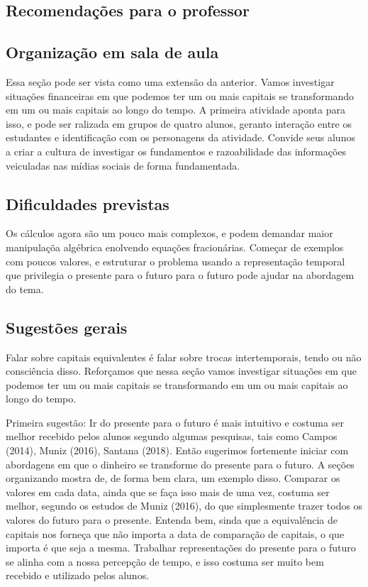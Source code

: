 \begin{paginatexto}
\section*{Recomendações para o professor}

\subsection{Organização em sala de aula} Essa seção pode ser vista como uma extensão da anterior. Vamos investigar situações financeiras em que podemos ter um ou mais capitais se transformando em um ou mais capitais ao longo do tempo. A primeira atividade aponta para isso, e pode ser ralizada em grupos de quatro alunos, geranto interação entre os estudantes e identificação com os personagens da atividade. Convide seus alunos a criar a cultura de investigar os fundamentos e razoabilidade das informações veiculadas nas mídias sociais de forma fundamentada.

\subsection{Dificuldades previstas} Os cálculos agora são um pouco mais complexos, e podem demandar maior manipulaçõa algébrica enolvendo equações fracionárias. Começar de exemplos com poucos valores, e estruturar o problema usando a representação temporal que privilegia o presente para o futuro para o futuro pode ajudar na abordagem do tema.

\subsection{Sugestões gerais}
Falar sobre capitais equivalentes é falar sobre trocas intertemporais, tendo ou não consciência disso. Reforçamos que nessa seção vamos investigar situações em que podemos ter um ou mais capitais se transformando em um ou mais capitais ao longo do tempo.

Primeira sugestão: Ir do presente para o futuro é mais intuitivo e costuma ser melhor recebido pelos alunos segundo algumas pesquisas, tais como Campos (2014), Muniz (2016), Santana (2018). Então sugerimos fortemente iniciar com abordagens em que o dinheiro se transforme do presente para o futuro. A seções organizando mostra de, de forma bem clara, um exemplo disso. Comparar os valores em cada data, ainda que se faça isso mais de uma vez, costuma ser melhor, segundo os estudos de Muniz (2016), do que simplesmente trazer todos os valores do futuro para o presente. Entenda bem, sinda que a equivalência de capitais nos forneça que não importa a data de comparação de capitais, o que importa é que seja a mesma. Trabalhar representações do presente para o futuro se alinha com a nossa percepção de tempo, e isso costuma ser muito bem recebido e utilizado pelos alunos.


\end{paginatexto}
